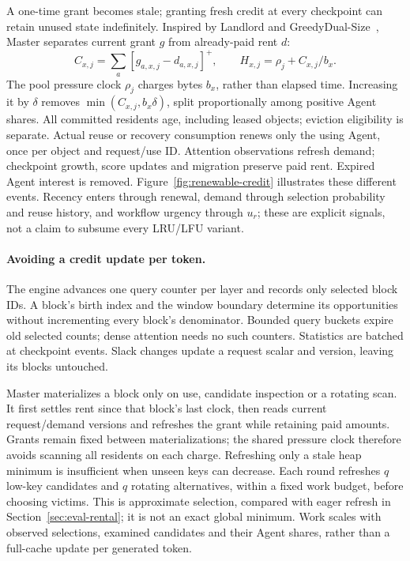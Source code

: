 A one-time grant becomes stale; granting fresh credit at every checkpoint
can retain unused state indefinitely. Inspired by Landlord and
GreedyDual-Size~\cite{young2002landlord,cao1997greedydual}, Master separates
current grant $g$ from already-paid rent $d$:
\begin{equation}
 C_{x,j}=\sum_a[g_{a,x,j}-d_{a,x,j}]^+,
 \qquad H_{x,j}=\rho_j+C_{x,j}/b_x.
 \label{eq:rental-credit}
\end{equation}
The pool pressure clock $\rho_j$ charges bytes $b_x$, rather than elapsed
time. Increasing it by $\delta$ removes $\min(C_{x,j},b_x\delta)$, split
proportionally among positive Agent shares. All committed residents age,
including leased objects; eviction eligibility is separate. Actual reuse or recovery consumption renews only the using Agent,
once per object and request/use ID. Attention observations refresh demand;
checkpoint growth, score updates and migration preserve paid rent.
Expired Agent interest is removed. Figure~\ref{fig:renewable-credit}
illustrates these different events. Recency enters through renewal,
demand through selection probability and reuse history, and workflow
urgency through $u_r$; these are explicit signals, not a claim to subsume
every LRU/LFU variant.

\paragraph{Avoiding a credit update per token.}
The engine advances one query counter per layer and records only selected
block IDs. A block's birth index and the window boundary determine its
opportunities without incrementing every block's denominator. Bounded
query buckets expire old selected counts; dense attention needs no such
counters. Statistics are batched at checkpoint events. Slack changes
update a request scalar and version, leaving its blocks untouched.

Master materializes a block only on use, candidate inspection or a
rotating scan. It first settles rent since that block's last clock,
then reads current request/demand versions and refreshes the grant while
retaining paid amounts. Grants remain fixed between materializations;
the shared pressure clock therefore avoids scanning all residents on
each charge. Refreshing only a stale heap minimum is insufficient when
unseen keys can decrease. Each round refreshes $q$ low-key candidates
and $q$ rotating alternatives, within a fixed work budget, before choosing
victims. This is approximate selection, compared with eager refresh in
Section~\ref{sec:eval-rental}; it is not an exact global minimum. Work
scales with observed selections, examined candidates and their Agent
shares, rather than a full-cache update per generated token.

